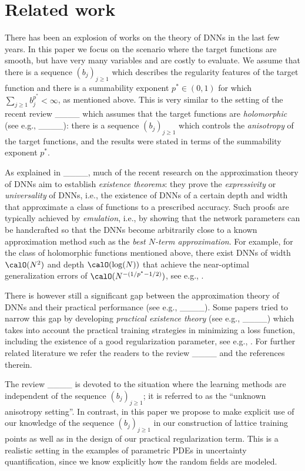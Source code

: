 \section{Related work}
There has been an explosion of works on the theory of DNNs in the last few
years. In this paper we focus on the scenario where the target functions
are smooth, but have very many variables and are costly to evaluate. We
assume that there is a sequence $(b_j)_{j\ge 1}$ which describes the
regularity features of the target function and there is a summability
exponent $p^* \in (0,1)$ for which $\sum_{j\ge 1} b_j^{p^*} < \infty$, as
mentioned above. This is very similar to the setting of the recent review
____ which assumes that the target functions are
\emph{holomorphic} (see e.g., ____): there is a sequence
$(b_j)_{j\ge 1}$ which controls the \emph{anisotropy} of the target
functions, and the results were stated in terms of the summability
exponent $p^*$.

As explained in ____, much of the recent research on the
approximation theory of DNNs aim to establish \emph{existence theorems}:
they prove the \emph{expressivity} or \emph{universality} of DNNs, i.e.,
the existence of DNNs of a certain depth and width that approximate a
class of functions to a prescribed accuracy. Such proofs are typically
achieved by \emph{emulation}, i.e., by showing that the network parameters
can be handcrafted so that the DNNs become arbitrarily close to a known
approximation method such as the \emph{best $N$-term approximation}. For
example, for the class of holomorphic functions mentioned above, there
exist DNNs of width $\calO(N^2)$ and depth $\calO(\log(N))$ that achieve
the near-optimal generalization errors of $\calO(N^{-(1/p^*-1/2)})$, see
e.g., \cite[Theorem~7.2]{ABDM24}.

There is however still a significant gap between the approximation theory
of DNNs and their practical performance (see e.g., ____). Some
papers tried to narrow this gap by developing \emph{practical existence
theory} (see e.g., ____) which takes into account the practical
training strategies in minimizing a loss function, including the existence
of a good regularization parameter, see e.g., \cite[Theorem~8.1]{ABDM24}.
For further related literature we refer the readers to the review
____ and the references therein.

The review ____ is devoted to the situation where the learning
methods are independent of the sequence $(b_j)_{j\ge1}$; it is referred to
as the ``unknown anisotropy setting''. In contrast, in this paper we
propose to make explicit use of our knowledge of the sequence
$(b_j)_{j\ge1}$ in our construction of lattice training points as well as
in the design of our practical regularization term. This is a realistic
setting in the examples of parametric PDEs in uncertainty quantification,
since we know explicitly how the random fields are modeled.

